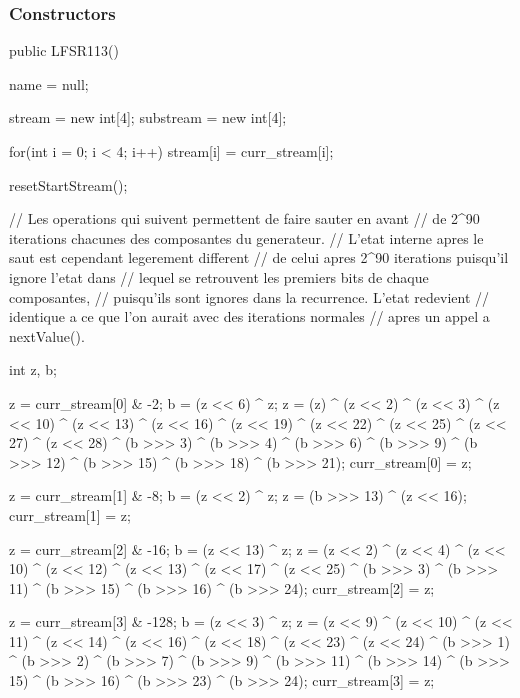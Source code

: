 \subsubsection* {Constructors}

\begin{code}
   public LFSR113() \begin{hide} {
      name = null;

      stream = new int[4];
      substream = new int[4];

      for(int i = 0; i < 4; i++)
         stream[i] = curr_stream[i];

      resetStartStream();


      // Les operations qui suivent permettent de faire sauter en avant
      // de 2^90 iterations chacunes des composantes du generateur.
      // L'etat interne apres le saut est cependant legerement different
      // de celui apres 2^90 iterations puisqu'il ignore l'etat dans
      // lequel se retrouvent les premiers bits de chaque composantes,
      // puisqu'ils sont ignores dans la recurrence. L'etat redevient
      // identique a ce que l'on aurait avec des iterations normales
      // apres un appel a nextValue().

      int z, b;

      z = curr_stream[0] & -2;
      b = (z <<  6) ^ z;
      z = (z) ^ (z << 2) ^ (z << 3) ^ (z << 10) ^ (z << 13) ^
         (z << 16) ^ (z << 19) ^ (z << 22) ^ (z << 25) ^
         (z << 27) ^ (z << 28) ^
         (b >>> 3) ^ (b >>> 4) ^ (b >>> 6) ^ (b >>> 9) ^ (b >>> 12) ^
         (b >>> 15) ^ (b >>> 18) ^ (b >>> 21);
      curr_stream[0] = z;


      z = curr_stream[1] & -8;
      b = (z <<  2) ^ z;
      z = (b >>> 13) ^ (z << 16);
      curr_stream[1] = z;


      z = curr_stream[2] & -16;
      b = (z <<  13) ^ z;
      z = (z << 2) ^ (z << 4) ^ (z << 10) ^ (z << 12) ^ (z << 13) ^
         (z << 17) ^ (z << 25) ^
         (b >>> 3) ^ (b >>> 11) ^ (b >>> 15) ^ (b >>> 16) ^ (b >>> 24);
      curr_stream[2] = z;


      z = curr_stream[3] & -128;
      b = (z <<  3) ^ z;
      z = (z << 9) ^ (z << 10) ^ (z << 11) ^ (z << 14) ^ (z << 16) ^
         (z << 18) ^ (z << 23) ^ (z << 24) ^
         (b >>> 1) ^ (b >>> 2) ^ (b >>> 7) ^ (b >>> 9) ^ (b >>> 11) ^
         (b >>> 14) ^ (b >>> 15) ^ (b >>> 16) ^ (b >>> 23) ^ (b >>> 24);
      curr_stream[3] = z;
   }\end{hide}
\end{code}
